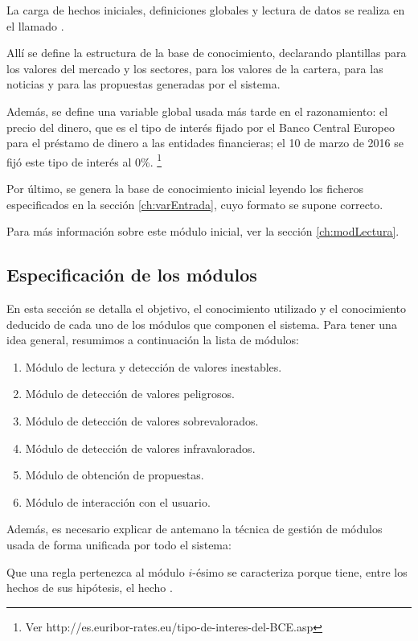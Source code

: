 \documentclass[a4paper, 11pt, titlepage]{article}
\begin{document}
    La carga de hechos iniciales, definiciones globales y lectura de datos se realiza en el llamado .

    Allí se define la estructura de la base de conocimiento, declarando plantillas para los valores del mercado y los sectores, para los valores de la cartera, para las noticias y para las propuestas generadas por el sistema.

    Además, se define una variable global usada más tarde en el razonamiento: el precio del dinero, que es el tipo de interés fijado por el Banco Central Europeo para el préstamo de dinero a las entidades financieras; el 10 de marzo de 2016 se fijó este tipo de interés al 0\%. \footnote{Ver http://es.euribor-rates.eu/tipo-de-interes-del-BCE.asp}

    Por último, se genera la base de conocimiento inicial leyendo los ficheros especificados en la sección \ref{ch:varEntrada}, cuyo formato se supone correcto.

    Para más información sobre este módulo inicial, ver la sección \ref{ch:modLectura}.

    \subsection{Especificación de los módulos}

    En esta sección se detalla el objetivo, el conocimiento utilizado y el conocimiento deducido de cada uno de los módulos que componen el sistema. Para tener una idea general, resumimos a continuación la lista de módulos:

    \begin{enumerate}\addtocounter{enumi}{-1}
        \item Módulo de lectura y detección de valores inestables.
        \item Módulo de detección de valores peligrosos.
        \item Módulo de detección de valores sobrevalorados.
        \item Módulo de detección de valores infravalorados.
        \item Módulo de obtención de propuestas.
        \item Módulo de interacción con el usuario.
    \end{enumerate}

    Además, es necesario explicar de antemano la técnica de gestión de módulos usada de forma unificada por todo el sistema:

    Que una regla pertenezca al módulo $i$-ésimo se caracteriza porque tiene, entre los hechos de sus hipótesis, el hecho .
\end{document}
